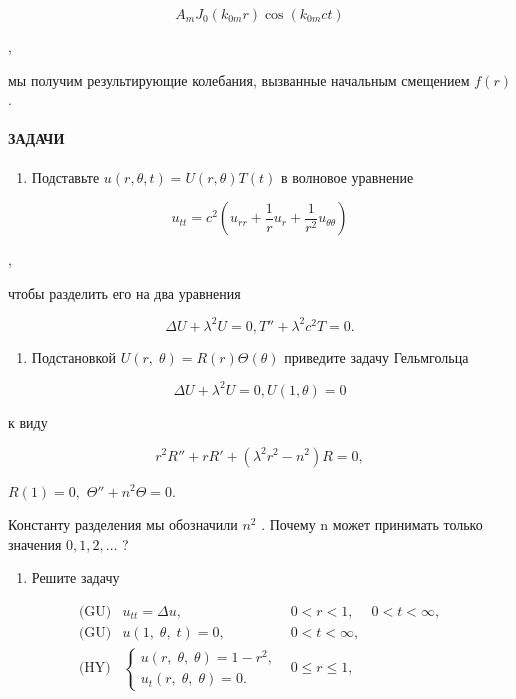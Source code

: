 \documentclass[
  ukrainian,
]{article}
\providecommand{\tightlist}{%
  \setlength{\itemsep}{0pt}\setlength{\parskip}{0pt}}
\begin{document}
\[
A_m J_0(k_{0m}r)\cos(k_{0m}ct)
\]

,

мы получим результирующие колебания, вызванные начальным смещением
\(f(r)\).

\paragraph{ЗАДАЧИ}\label{ux437ux430ux434ux430ux447ux438-6}

\begin{enumerate}
\def\labelenumi{\arabic{enumi}.}
\tightlist
\item
  Подставьте \(u(r, \theta, t) = U(r, \theta) T(t)\) в волновое
  уравнение
\end{enumerate}

\[
u_{tt} = c^2 \left( u_{rr} + \frac{1}{r} u_r + \frac{1}{r^2} u_{\theta\theta} \right)
\]

,

чтобы разделить его на два уравнения

\[
\Delta U + \lambda^2 U = 0,
T'' + \lambda^2 c^2 T = 0.
\]

\begin{enumerate}
\def\labelenumi{\arabic{enumi}.}
\setcounter{enumi}{1}
\tightlist
\item
  Подстановкой
  \(U\left(r,\;\theta\right)=R\left(r\right)\Theta\left(\theta\right)\)
  приведите задачу Гельмгольца
\end{enumerate}

\[
\Delta U + \lambda^2 U = 0,
U(1, \theta) = 0
\]

к виду

\[
r^2R'' + rR' + (\lambda^2r^2 - n^2)R = 0,
\]

\(R(1) = 0,\) \(\Theta'' + n^2\Theta = 0.\)

Константу разделения мы обозначили \(n^2\) . Почему n может принимать
только значения \(0, 1, 2, \ldots\) ?

\begin{enumerate}
\def\labelenumi{\arabic{enumi}.}
\setcounter{enumi}{2}
\tightlist
\item
  Решите задачу
\end{enumerate}

\[
\begin{array}{lll} \text{(GU)} & u_{tt} = \Delta u, & 0 < r < 1, & 0 < t < \infty, \\ \text{(GU)} & u\left(1, \; \theta, \; t\right) = 0, & 0 < t < \infty, \\ \text{(HY)} & \begin{cases} u\left(r, \; \theta, \; \theta\right) = 1 - r^2, \\ u_t\left(r, \; \theta, \; \theta\right) = 0. \end{cases} & 0 \leqslant r \leqslant 1, \\ \end{array}
\]
\end{document}
